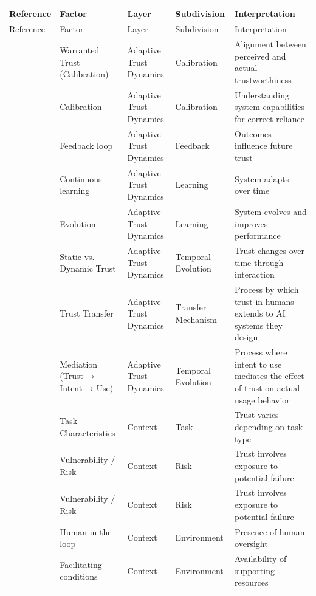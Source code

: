 \documentclass[sigconf]{acmart}
\begin{document}
\onecolumn
\begin{longtable}{l l l l p{4cm}}
\toprule
Reference & Factor & Layer & Subdivision & Interpretation \\
\midrule
\endfirsthead
\toprule
Reference & Factor & Layer & Subdivision & Interpretation \\
\midrule
\endhead
\cite{jacovi_2021_formalizing_trust_ai} & Warranted Trust (Calibration) & Adaptive Trust Dynamics & Calibration & Alignment between perceived and actual trustworthiness \\
\cite{carsten_hmi_automated_cars} & Calibration & Adaptive Trust Dynamics & Calibration & Understanding system capabilities for correct reliance \\
\cite{de_visser_longitudinal_trust} & Feedback loop & Adaptive Trust Dynamics & Feedback & Outcomes influence future trust \\
\cite{wang2019artificial} & Continuous learning & Adaptive Trust Dynamics & Learning & System adapts over time \\
\cite{wang2019artificial} & Evolution & Adaptive Trust Dynamics & Learning & System evolves and improves performance \\
\cite{vereschak2021evaluate} & Static vs. Dynamic Trust & Adaptive Trust Dynamics & Temporal Evolution & Trust changes over time through interaction \\
\cite{schepman_general_attitude} & Trust Transfer & Adaptive Trust Dynamics & Transfer Mechanism & Process by which trust in humans extends to AI systems they design \\
\cite{choudhury_chat_gpt} & Mediation (Trust → Intent → Use) & Adaptive Trust Dynamics & Temporal Evolution & Process where intent to use mediates the effect of trust on actual usage behavior \\
\cite{glickson_2020_review_of_empirical_research} & Task Characteristics & Context & Task & Trust varies depending on task type \\
\cite{jacovi_2021_formalizing_trust_ai} & Vulnerability / Risk & Context & Risk & Trust involves exposure to potential failure \\
\cite{de_visser_longitudinal_trust} & Vulnerability / Risk & Context & Risk & Trust involves exposure to potential failure \\
\cite{young_patient_systematic_review} & Human in the loop & Context & Environment & Presence of human oversight \\
\cite{chi_formative_scale} & Facilitating conditions & Context & Environment & Availability of supporting resources \\

\end{longtable}
\end{document}
